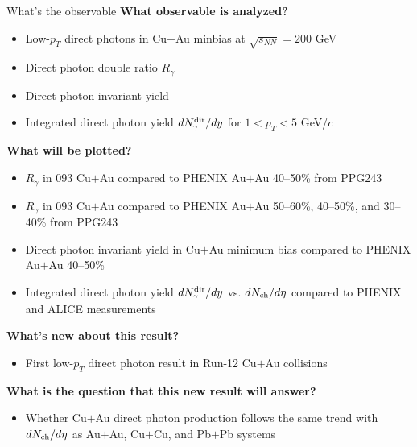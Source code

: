 \documentclass[10pt, dvipsnames]{beamer}
\begin{document}
\begin{frame}{What's the observable}
   \textbf{What observable is analyzed?}
   \begin{itemize}
      \item[$\bullet$] Low-$p_T$ direct photons in Cu$+$Au minbias at $\sqrt{s_{NN}}=200$ GeV
      \item[$\bullet$] Direct photon double ratio $R_\gamma$
      \item[$\bullet$] Direct photon invariant yield
      \item[$\bullet$] Integrated direct photon yield $dN_{\gamma}^{\rm dir}/dy$ for $1<p_T<5$ GeV/$c$
   \end{itemize}

   \textbf{What will be plotted?}
   \small
   \begin{itemize}
      \item[$\bullet$] $R_\gamma$ in 093 Cu$+$Au compared to PHENIX Au$+$Au 40--50\% from PPG243
      \item[$\bullet$] $R_\gamma$ in 093 Cu$+$Au compared to PHENIX Au$+$Au 50--60\%, 40--50\%, and 30--40\% from PPG243
      \item[$\bullet$] Direct photon invariant yield in Cu$+$Au minimum bias compared to PHENIX Au$+$Au 40--50\%
      \item[$\bullet$] Integrated direct photon yield $dN_{\gamma}^{\rm dir}/dy$ vs. $dN_{\rm ch}/d\eta$ compared to PHENIX and ALICE measurements
   \end{itemize}

   \textbf{What's new about this result?}
   \begin{itemize}
      \item[$\bullet$] First low-$p_T$ direct photon result in Run-12 Cu$+$Au collisions 
   \end{itemize}

   \textbf{What is the question that this new result will answer?}
   \begin{itemize}
      \item[$\bullet$] Whether Cu$+$Au direct photon production follows the same trend with $dN_{\rm ch}/d\eta$ as Au$+$Au, Cu$+$Cu, and Pb$+$Pb systems
   \end{itemize}
\end{frame}
\end{document}
